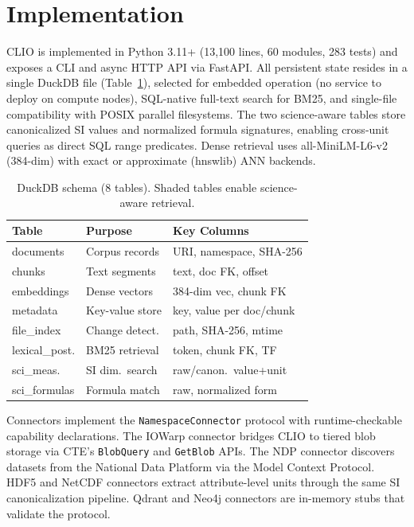 \section{Implementation}

CLIO is implemented in Python 3.11+ (13{,}100 lines, 60 modules, 283 tests) and exposes a CLI and async HTTP API via FastAPI. All persistent state resides in a single DuckDB file (Table~\ref{tab:schema}), selected for embedded operation (no service to deploy on compute nodes), SQL-native full-text search for BM25, and single-file compatibility with POSIX parallel filesystems. The two science-aware tables store canonicalized SI values and normalized formula signatures, enabling cross-unit queries as direct SQL range predicates. Dense retrieval uses all-MiniLM-L6-v2 (384-dim) with exact or approximate (hnswlib) ANN backends.

\begin{table}[!t]
\centering
\caption{DuckDB schema (8 tables). Shaded tables enable science-aware retrieval.}
\label{tab:schema}
\footnotesize
\renewcommand{\arraystretch}{1.15}
\setlength{\tabcolsep}{3pt}
\begin{tabular}{@{}l l l@{}}
\toprule
\textbf{Table} & \textbf{Purpose} & \textbf{Key Columns} \\
\midrule
documents         & Corpus records    & URI, namespace, SHA-256 \\
chunks            & Text segments     & text, doc FK, offset \\
embeddings        & Dense vectors     & 384-dim vec, chunk FK \\
metadata          & Key-value store   & key, value per doc/chunk \\
file\_index       & Change detect.    & path, SHA-256, mtime \\
lexical\_post.    & BM25 retrieval    & token, chunk FK, TF \\
\rowcolor{gray!10}
sci\_meas.        & SI dim.\ search   & raw/canon.\ value+unit \\
\rowcolor{gray!10}
sci\_formulas     & Formula match     & raw, normalized form \\
\bottomrule
\end{tabular}
\renewcommand{\arraystretch}{1.15}
\end{table}

Connectors implement the \texttt{NamespaceConnector} protocol with runtime-checkable capability declarations. The IOWarp connector bridges CLIO to tiered blob storage via CTE's \texttt{BlobQuery} and \texttt{GetBlob} APIs. The NDP connector discovers datasets from the National Data Platform via the Model Context Protocol. HDF5 and NetCDF connectors extract attribute-level units through the same SI canonicalization pipeline. Qdrant and Neo4j connectors are in-memory stubs that validate the protocol.

